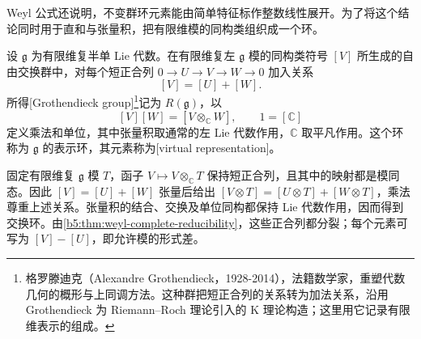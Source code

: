 Weyl 公式还说明，不变群环元素能由简单特征标作整数线性展开。为了将这个结论同时用于直和与张量积，把有限维模的同构类组织成一个环。

\begin{definition}\label{b5:def:lie-representation-ring}
	设 \(\mathfrak g\) 为有限维复半单 Lie 代数。在有限维复左 \(\mathfrak g\) 模的同构类符号 \([V]\) 所生成的自由交换群中，对每个短正合列 \(0\rightarrow U\rightarrow V\rightarrow W\rightarrow0\) 加入关系
	\[
		[V]=[U]+[W].
	\]
	所得[Grothendieck group]\footnote{格罗滕迪克（Alexandre Grothendieck，1928-2014），法籍数学家，重塑代数几何的概形与上同调方法。这种群把短正合列的关系转为加法关系，沿用 Grothendieck 为 Riemann--Roch 理论引入的 K 理论构造；这里用它记录有限维表示的组成。}记为 \(R(\mathfrak g)\)，以
	\[
		[V][W]=[V\otimes_{\mathbb C}W],\qquad 1=[\mathbb C]
	\]
	定义乘法和单位，其中张量积取通常的左 Lie 代数作用，\(\mathbb C\) 取平凡作用。这个环称为 \(\mathfrak g\) 的表示环，其元素称为[virtual representation]。
\end{definition}

固定有限维复 \(\mathfrak g\) 模 \(T\)，函子 \(V\mapsto V\otimes_{\mathbb C}T\) 保持短正合列，且其中的映射都是模同态。因此 \([V]=[U]+[W]\) 张量后给出 \([V\otimes T]=[U\otimes T]+[W\otimes T]\)，乘法尊重上述关系。张量积的结合、交换及单位同构都保持 Lie 代数作用，因而得到交换环。由\cref{b5:thm:weyl-complete-reducibility}，这些正合列都分裂；每个元素可写为 \([V]-[U]\)，即允许模的形式差。

